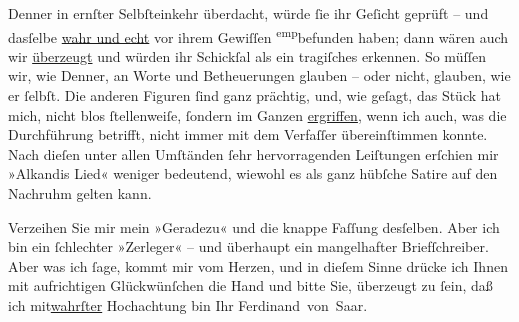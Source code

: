                   Denner in ernſter
               Selbſteinkehr überdacht, würde ſie ihr Geſicht geprüft – und dasſelbe \uline{wahr und echt} vor ihrem Gewiſſen \substVorne{}\textsuperscript{emp}\substDazwischen{}be\substHinten{}funden haben; dann wären auch wir \uline{überzeugt}
               und würden ihr Schickſal als ein tragiſches erkennen. So müſſen wir, wie Denner, an Worte und
               Betheuerungen glauben – oder nicht, glauben, wie er ſelbſt. Die anderen Figuren ſind
               ganz prächtig, und, wie geſagt, das Stück hat mich, nicht blos ſtellenweiſe, ſondern im Ganzen \uline{ergriffen}, wenn ich auch, was die Durchführung
               betrifft, nicht immer mit dem Verfaſſer übereinſtimmen konnte. Nach dieſen unter
               allen Umſtänden ſehr hervorragenden Leiſtungen erſchien mir »Alkandis Lied« weniger bedeutend, wiewohl es als ganz hübſche
               Satire auf den Nachruhm gelten kann.\pend
           
\pstart
           Verzeihen Sie mir mein »Geradezu« und die knappe Faſſung desſelben. Aber ich bin {\pb}ein ſchlechter »Zerleger« – und überhaupt ein
               mangelhafter Briefſchreiber. Aber was ich ſage, kommt mir vom Herzen, und in dieſem
               Sinne drücke ich Ihnen mit aufrichtigen Glückwünſchen die Hand und bitte Sie,
               überzeugt zu ſein, daß ich \introOben{}mit\introOben{}{ }\uline{wahrſter} Hochachtung bin\pend
           \pstart Ihr \spacefill\mbox{Ferdinand von Saar.}\pend{}\endnumbering{}  
      